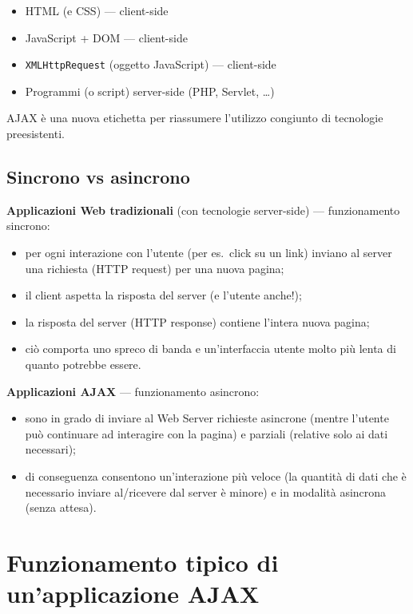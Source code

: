 \begin{itemize}
    \item HTML (e CSS) --- client-side
    \item JavaScript + DOM --- client-side
    \item \texttt{XMLHttpRequest} (oggetto JavaScript) --- client-side
    \item Programmi (o script) server-side (PHP, Servlet, \dots)
\end{itemize}

AJAX è una nuova etichetta per riassumere l'utilizzo congiunto di tecnologie preesistenti.

\subsection{Sincrono vs asincrono}

\textbf{Applicazioni Web tradizionali} (con tecnologie server-side) --- funzionamento sincrono:
\begin{itemize}
    \item per ogni interazione con l'utente (per es.\ click su un link) inviano al server una richiesta (HTTP request) per una nuova pagina;
    \item il client aspetta la risposta del server (e l'utente anche!);
    \item la risposta del server (HTTP response) contiene l'intera nuova pagina;
    \item ciò comporta uno spreco di banda e un'interfaccia utente molto più lenta di quanto potrebbe essere.
\end{itemize}

\textbf{Applicazioni AJAX} --- funzionamento asincrono:
\begin{itemize}
    \item sono in grado di inviare al Web Server richieste asincrone (mentre l'utente può continuare ad interagire con la pagina) e parziali (relative solo ai dati necessari);
    \item di conseguenza consentono un'interazione più veloce (la quantità di dati che è necessario inviare al/ricevere dal server è minore) e in modalità asincrona (senza attesa).
\end{itemize}

\section{Funzionamento tipico di un'applicazione AJAX}


